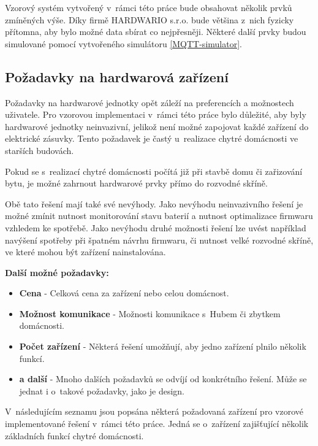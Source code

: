 Vzorový systém vytvořený v~rámci této práce bude obsahovat několik prvků zmíněných výše. Díky firmě HARDWARIO s.r.o. bude většina z~nich fyzicky přítomna, aby bylo možné data sbírat co nejpřesněji. Některé další prvky budou simulované pomocí vytvořeného simulátoru \ref{MQTT-simulator}.

\subsection*{Požadavky na hardwarová zařízení}
Požadavky na hardwarové jednotky opět záleží na preferencích a možnostech uživatele. Pro vzorovou implementaci v~rámci této práce bylo důležité, aby byly hardwarové jednotky neinvazivní, jelikož není možné zapojovat každé zařízení do elektrické zásuvky. Tento požadavek je častý u~realizace chytré domácnosti ve starších budovách.

Pokud se s~realizací chytré domácnosti počítá již při stavbě domu či zařizování bytu, je možné zahrnout hardwarové prvky přímo do rozvodné skříně.

Obě tato řešení mají také své nevýhody. Jako nevýhodu neinvazivního řešení je možné zmínit nutnost monitorování stavu baterií a nutnost optimalizace firmwaru vzhledem ke spotřebě. Jako nevýhodu druhé možnosti řešení lze uvést například navýšení spotřeby při špatném návrhu firmwaru, či nutnost velké rozvodné skříně, ve které mohou být zařízení nainstalována.

\noindent\textbf{Další možné požadavky:}
\begin{itemize}
  \item \textbf{Cena} - Celková cena za zařízení nebo celou domácnost.
  \item \textbf{Možnost komunikace} - Možnosti komunikace s~Hubem či zbytkem domácnosti.
  \item \textbf{Počet zařízení} - Některá řešení umožňují, aby jedno zařízení plnilo několik funkcí.
  \item \textbf{a další} - Mnoho dalších požadavků se odvíjí od konkrétního řešení. Může se jednat i o~takové požadavky, jako je design.
\end{itemize}

V~následujícím seznamu jsou popsána některá požadovaná zařízení pro vzorové implementované řešení v~rámci této práce. Jedná se o~zařízení zajišťující několik základních funkcí chytré domácnosti.

